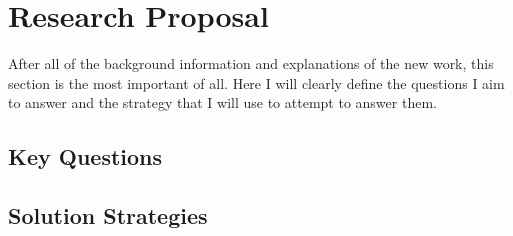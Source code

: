 \chapter{Research Proposal}
\label{ch:research_proposal}

After all of the background information and explanations of the new
work, this section is the most important of all. Here I will clearly
define the questions I aim to answer and the strategy that I will use
to attempt to answer them.

\section{Key Questions}
\label{sec:key_questions}

\section{Solution Strategies}
\label{seq:solution_strategies}
